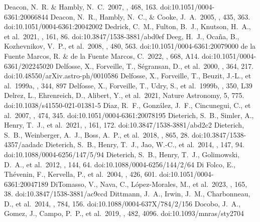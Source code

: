\documentclass[twocolumn,tighten,twocolappendix]{aastex631}
\begin{document}
\begin{thebibliography}{}
 Deacon, N.~R. \& Hambly, N.~C.\ 2007, \aap, 468, 163. doi:10.1051/0004-6361:20066844
 Deacon, N.~R., Hambly, N.~C., \& Cooke, J.~A.\ 2005, \aap, 435, 363. doi:10.1051/0004-6361:20042002
 Dedrick, C.~M., Fulton, B.~J., Knutson, H.~A., et al.\ 2021, \aj, 161, 86. doi:10.3847/1538-3881/abd0ef
 Deeg, H.~J., Oca{\~n}a, B., Kozhevnikov, V.~P., et al.\ 2008, \aap, 480, 563. doi:10.1051/0004-6361:20079000
 de la Fuente Marcos, R. \& de la Fuente Marcos, C.\ 2022, \aap, 668, A14. doi:10.1051/0004-6361/202245020
 Delfosse, X., Forveille, T., S{\'e}gransan, D., et al.\ 2000, \aap, 364, 217. doi:10.48550/arXiv.astro-ph/0010586
 Delfosse, X., Forveille, T., Beuzit, J.-L., et al.\ 1999a, \aap, 344, 897
 Delfosse, X., Forveille, T., Udry, S., et al.\ 1999b, \aap, 350, L39
 Delrez, L., Ehrenreich, D., Alibert, Y., et al.\ 2021, Nature Astronomy, 5, 775. doi:10.1038/s41550-021-01381-5
 D{\'\i}az, R.~F., Gonz{\'a}lez, J.~F., Cincunegui, C., et al.\ 2007, \aap, 474, 345. doi:10.1051/0004-6361:20078195
 Dieterich, S.~B., Simler, A., Henry, T.~J., et al.\ 2021, \aj, 161, 172. doi:10.3847/1538-3881/abd2c2
 Dieterich, S.~B., Weinberger, A.~J., Boss, A.~P., et al.\ 2018, \apj, 865, 28. doi:10.3847/1538-4357/aadadc
 Dieterich, S.~B., Henry, T.~J., Jao, W.-C., et al.\ 2014, \aj, 147, 94. doi:10.1088/0004-6256/147/5/94
 Dieterich, S.~B., Henry, T.~J., Golimowski, D.~A., et al.\ 2012, \aj, 144, 64. doi:10.1088/0004-6256/144/2/64
 Di Folco, E., Th{\'e}venin, F., Kervella, P., et al.\ 2004, \aap, 426, 601. doi:10.1051/0004-6361:20047189
 DiTomasso, V., Nava, C., L{\'o}pez-Morales, M., et al.\ 2023, \aj, 165, 38. doi:10.3847/1538-3881/ac9ccd
 Dittmann, J.~A., Irwin, J.~M., Charbonneau, D., et al.\ 2014, \apj, 784, 156. doi:10.1088/0004-637X/784/2/156
 Docobo, J.~A., Gomez, J., Campo, P.~P., et al.\ 2019, \mnras, 482, 4096. doi:10.1093/mnras/sty2704

\end{thebibliography}
\end{document}
